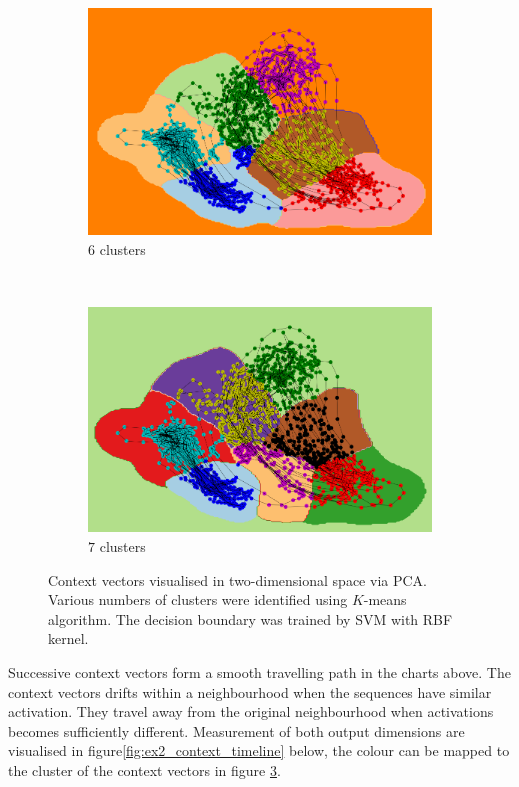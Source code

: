 \documentclass[11pt]{article} %
\theoremstyle{plain}
\theoremstyle{definition}
\begin{document}
\begin{figure}[H]
	\begin{subfigure}[b]{0.48\textwidth}
		\includegraphics[width=\textwidth]{ex2_pca_cluster_6.PNG}
		\caption{\(6\) clusters}
		\label{fig:ex2_pca_cluster_6}
	\end{subfigure}
	~
	\begin{subfigure}[b]{0.48\textwidth}
		\includegraphics[width=\textwidth]{ex2_pca_cluster_7.PNG}
		\caption{\(7\) clusters}
		\label{fig:ex2_pca_cluster_7}
	\end{subfigure}
	
	\caption{Context vectors visualised in two-dimensional space via PCA. Various numbers of clusters were identified using \(K\)-means algorithm. The decision boundary was trained by SVM with RBF kernel.}
	
	\label{fig:ex2_pca_cluster}
\end{figure}

Successive context vectors form a smooth travelling path in the charts above. The context vectors drifts within a neighbourhood when the sequences have similar activation. They travel away from the original neighbourhood when activations becomes sufficiently different. Measurement of both output dimensions are visualised in figure\ref{fig:ex2_context_timeline} below, the colour can be mapped to the cluster of the context vectors in figure \ref{fig:ex2_pca_cluster}.
\end{document}
